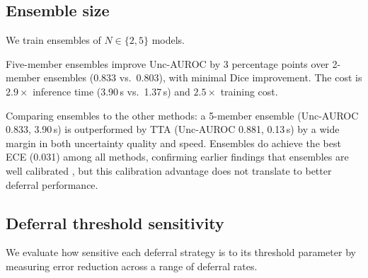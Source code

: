 \subsection{Ensemble size}

We train ensembles of $N \in \{2, 5\}$ models.

\begin{table}[H]
\centering
\caption{Effect of ensemble size on DRIVE test set. Moving from 2 to 5
members improves Unc-AUROC by 3 percentage points but nearly triples
inference time.}
\label{tab:ensemble_size}
\small
\setlength{\tabcolsep}{4.6pt}
\end{table}

Five-member ensembles improve Unc-AUROC by 3 percentage points over
2-member ensembles (0.833 vs.\ 0.803), with minimal Dice improvement.
The cost is $2.9\times$ inference time (3.90\,s vs.\ 1.37\,s) and
$2.5\times$ training cost.

Comparing ensembles to the other methods: a 5-member ensemble (Unc-AUROC
0.833, 3.90\,s) is outperformed by TTA (Unc-AUROC 0.881, 0.13\,s) by a
wide margin in both uncertainty quality and speed. Ensembles do achieve
the best ECE (0.031) among all methods, confirming earlier findings that
ensembles are well calibrated \citep{lakshminarayanan2017simple}, but
this calibration advantage does not translate to better deferral performance.

\subsection{Deferral threshold sensitivity}

We evaluate how sensitive each deferral strategy is to its threshold
parameter by measuring error reduction across a range of deferral rates.

